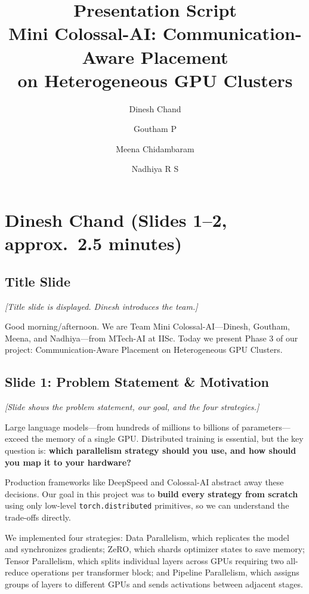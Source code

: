 \documentclass[11pt, a4paper]{article}
\title{Presentation Script\\[0.3em]\large Mini Colossal-AI: Communication-Aware Placement\\on Heterogeneous GPU Clusters}
\author{Dinesh Chand \and Goutham P \and Meena Chidambaram \and Nadhiya R S}
\date{}
\begin{document}
\maketitle
\tableofcontents
\newpage

\section{Dinesh Chand (Slides 1--2, approx.\ 2.5 minutes)}

\subsection{Title Slide}
\textit{[Title slide is displayed. Dinesh introduces the team.]}

Good morning/afternoon. We are Team Mini Colossal-AI---Dinesh, Goutham, Meena, and Nadhiya---from MTech-AI at IISc. Today we present Phase 3 of our project: Communication-Aware Placement on Heterogeneous GPU Clusters.

\subsection{Slide 1: Problem Statement \& Motivation}
\textit{[Slide shows the problem statement, our goal, and the four strategies.]}

Large language models---from hundreds of millions to billions of parameters---exceed the memory of a single GPU. Distributed training is essential, but the key question is: \textbf{which parallelism strategy should you use, and how should you map it to your hardware?}

Production frameworks like DeepSpeed and Colossal-AI abstract away these decisions. Our goal in this project was to \textbf{build every strategy from scratch} using only low-level \texttt{torch.distributed} primitives, so we can understand the trade-offs directly.

We implemented four strategies: Data Parallelism, which replicates the model and synchronizes gradients; ZeRO, which shards optimizer states to save memory; Tensor Parallelism, which splits individual layers across GPUs requiring two all-reduce operations per transformer block; and Pipeline Parallelism, which assigns groups of layers to different GPUs and sends activations between adjacent stages.
\end{document}
